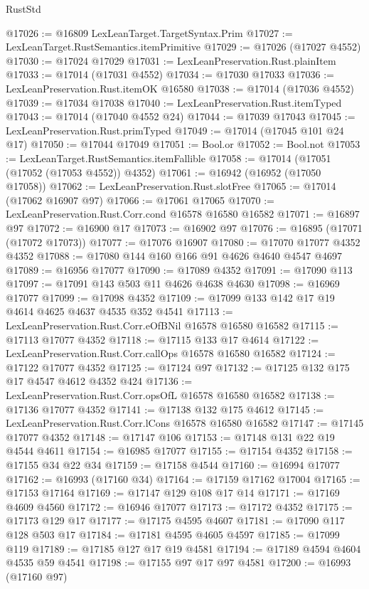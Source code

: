 \begin{lexlean}{RustStd}
\begin{coremodule}
{\begin{coremodule}
{{{{{{{{{{{{{{{{{{{{{{{{{{{{{{{{{{{{{{{{{{{{{{{{{{{{{{{@17026 := @16809 LexLeanTarget.TargetSyntax.Prim
@17027 := LexLeanTarget.RustSemantics.itemPrimitive
@17029 := @17026 (@17027 @4552)
@17030 := @17024 @17029
@17031 := LexLeanPreservation.Rust.plainItem
@17033 := @17014 (@17031 @4552)
@17034 := @17030 @17033
@17036 := LexLeanPreservation.Rust.itemOK @16580
@17038 := @17014 (@17036 @4552)
@17039 := @17034 @17038
@17040 := LexLeanPreservation.Rust.itemTyped
@17043 := @17014 (@17040 @4552 @24)
@17044 := @17039 @17043
@17045 := LexLeanPreservation.Rust.primTyped
@17049 := @17014 (@17045 @101 @24 @17)
@17050 := @17044 @17049
@17051 := Bool.or
@17052 := Bool.not
@17053 := LexLeanTarget.RustSemantics.itemFallible
@17058 := @17014 (@17051 (@17052 (@17053 @4552)) @4352)
@17061 := @16942 (@16952 (@17050 @17058))
@17062 := LexLeanPreservation.Rust.slotFree
@17065 := @17014 (@17062 @16907 @97)
@17066 := @17061 @17065
@17070 := LexLeanPreservation.Rust.Corr.cond @16578 @16580 @16582
@17071 := @16897 @97
@17072 := @16900 @17
@17073 := @16902 @97
@17076 := @16895 (@17071 (@17072 @17073))
@17077 := @17076 @16907
@17080 := @17070 @17077 @4352 @4352
@17088 := @17080 @144 @160 @166 @91 @4626 @4640 @4547 @4697
@17089 := @16956 @17077
@17090 := @17089 @4352
@17091 := @17090 @113
@17097 := @17091 @143 @503 @11 @4626 @4638 @4630
@17098 := @16969 @17077
@17099 := @17098 @4352
@17109 := @17099 @133 @142 @17 @19 @4614 @4625 @4637 @4535 @352 @4541
@17113 := LexLeanPreservation.Rust.Corr.eOfBNil @16578 @16580 @16582
@17115 := @17113 @17077 @4352
@17118 := @17115 @133 @17 @4614
@17122 := LexLeanPreservation.Rust.Corr.callOps @16578 @16580 @16582
@17124 := @17122 @17077 @4352
@17125 := @17124 @97
@17132 := @17125 @132 @175 @17 @4547 @4612 @4352 @424
@17136 := LexLeanPreservation.Rust.Corr.opsOfL @16578 @16580 @16582
@17138 := @17136 @17077 @4352
@17141 := @17138 @132 @175 @4612
@17145 := LexLeanPreservation.Rust.Corr.lCons @16578 @16580 @16582
@17147 := @17145 @17077 @4352
@17148 := @17147 @106
@17153 := @17148 @131 @22 @19 @4544 @4611
@17154 := @16985 @17077
@17155 := @17154 @4352
@17158 := @17155 @34 @22 @34
@17159 := @17158 @4544
@17160 := @16994 @17077
@17162 := @16993 (@17160 @34)
@17164 := @17159 @17162 @17004
@17165 := @17153 @17164
@17169 := @17147 @129 @108 @17 @14
@17171 := @17169 @4609 @4560
@17172 := @16946 @17077
@17173 := @17172 @4352
@17175 := @17173 @129 @17
@17177 := @17175 @4595 @4607
@17181 := @17090 @117 @128 @503 @17
@17184 := @17181 @4595 @4605 @4597
@17185 := @17099 @119
@17189 := @17185 @127 @17 @19 @4581
@17194 := @17189 @4594 @4604 @4535 @59 @4541
@17198 := @17155 @97 @17 @97 @4581
@17200 := @16993 (@17160 @97)
}}}}}}}}}}}}}}}}}}}}}}}}}}}}}}}}}}}}}}}}}}}}}}}}}}}}}}}
\end{coremodule}}
\end{coremodule}
\end{lexlean}
